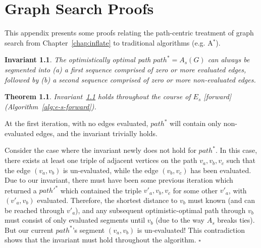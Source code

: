 \documentclass{report}
\newtheorem{invariant}{Invariant}
\newtheorem{theorem}{Theorem}
\newenvironment{proof}[1][Proof]{\begin{trivlist}
   \item[\hskip \labelsep {\bfseries #1}]}{\hfill$\square$\end{trivlist}}
\begin{document}
{\small


}

\appendix
\chapter{Graph Search Proofs}
\label{appendix:gs-proofs}

This appendix presents some proofs relating the path-centric treatment
of graph search from Chapter~\ref{chap:inflate}
to traditional algorithms (e.g. A$^*$).

\begin{invariant}
The optimistically optimal path $path^* = A_s(G)$ can always be
segmented into
(a) a first sequence comprised of zero or more evaluated edges,
followed by
(b) a second sequence comprised of zero or more non-evaluated edges.
\label{inv:path-segmentation}
\end{invariant}

\begin{theorem}
Invariant~\ref{inv:path-segmentation} holds throughout the course of
$E_s$ [forward] (Algorithm~\ref{alg:e-s-forward}).
\label{thm:seg-fwd}
\end{theorem}

\begin{proof}
At the first iteration, with no edges evaluated,
$path^*$ will contain only non-evaluated edges,
and the invariant trivially holds.

Consider the case where the invariant newly does not hold for $path^*$.
In this case, there exists at least one triple of adjacent vertices
on the path $v_a, v_b, v_c$
such that the edge $(v_a, v_b)$ is un-evaluated,
while the edge $(v_b, v_c)$ has been evaluated.
Due to our invariant,
there must have been some previous iteration which returned a
$path'^*$ which contained the triple
$v'_a, v_b, v_c$ for some other $v'_a$,
with $(v'_a, v_b)$ evaluated.
Therefore, the shortest distance to $v_b$ must known (and can be
reached through $v'_a$),
and any subsequent optimistic-optimal path through $v_b$
must consist of only evaluated segments until $v_b$
(due to the way $A_s$ breaks ties).
But our current $path^*$'s segment $(v_a, v_b)$ is un-evaluated!
This contradiction shows that the invariant must hold throughout the
algorithm.
\end{proof}
\end{document}
